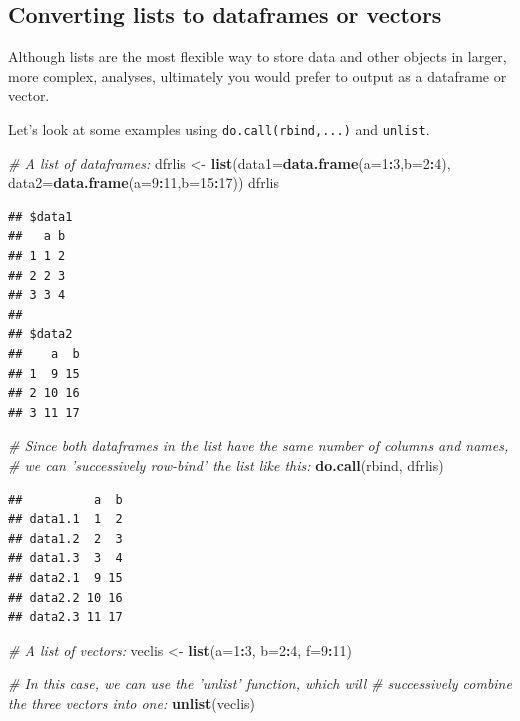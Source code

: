 \documentclass[]{book}
\newenvironment{Shaded}{\begin{snugshade}}{\end{snugshade}}
\newcommand{\CommentTok}[1]{\textcolor[rgb]{0.56,0.35,0.01}{\textit{#1}}}
\newcommand{\DataTypeTok}[1]{\textcolor[rgb]{0.13,0.29,0.53}{#1}}
\newcommand{\DecValTok}[1]{\textcolor[rgb]{0.00,0.00,0.81}{#1}}
\newcommand{\KeywordTok}[1]{\textcolor[rgb]{0.13,0.29,0.53}{\textbf{#1}}}
\newcommand{\NormalTok}[1]{#1}
\newcommand{\OperatorTok}[1]{\textcolor[rgb]{0.81,0.36,0.00}{\textbf{#1}}}
\newcommand{\StringTok}[1]{\textcolor[rgb]{0.31,0.60,0.02}{#1}}
\begin{document}
\hypertarget{converting-lists-to-dataframes-or-vectors}{%
\subsection{Converting lists to dataframes or vectors}\label{converting-lists-to-dataframes-or-vectors}}

Although lists are the most flexible way to store data and other objects in larger, more complex, analyses, ultimately you would prefer to output as a dataframe or vector.

Let's look at some examples using \texttt{do.call(rbind,...)} and \texttt{unlist}.

\begin{Shaded}
\begin{Highlighting}[]
\CommentTok{# A list of dataframes:}
\NormalTok{dfrlis <-}\StringTok{ }\KeywordTok{list}\NormalTok{(}\DataTypeTok{data1=}\KeywordTok{data.frame}\NormalTok{(}\DataTypeTok{a=}\DecValTok{1}\OperatorTok{:}\DecValTok{3}\NormalTok{,}\DataTypeTok{b=}\DecValTok{2}\OperatorTok{:}\DecValTok{4}\NormalTok{), }\DataTypeTok{data2=}\KeywordTok{data.frame}\NormalTok{(}\DataTypeTok{a=}\DecValTok{9}\OperatorTok{:}\DecValTok{11}\NormalTok{,}\DataTypeTok{b=}\DecValTok{15}\OperatorTok{:}\DecValTok{17}\NormalTok{))}
\NormalTok{dfrlis}
\end{Highlighting}
\end{Shaded}

\begin{verbatim}
## $data1
##   a b
## 1 1 2
## 2 2 3
## 3 3 4
## 
## $data2
##    a  b
## 1  9 15
## 2 10 16
## 3 11 17
\end{verbatim}

\begin{Shaded}
\begin{Highlighting}[]
\CommentTok{# Since both dataframes in the list have the same number of columns and names, }
\CommentTok{# we can 'successively row-bind' the list like this:}
\KeywordTok{do.call}\NormalTok{(rbind, dfrlis)}
\end{Highlighting}
\end{Shaded}

\begin{verbatim}
##          a  b
## data1.1  1  2
## data1.2  2  3
## data1.3  3  4
## data2.1  9 15
## data2.2 10 16
## data2.3 11 17
\end{verbatim}

\begin{Shaded}
\begin{Highlighting}[]
\CommentTok{# A list of vectors:}
\NormalTok{veclis <-}\StringTok{ }\KeywordTok{list}\NormalTok{(}\DataTypeTok{a=}\DecValTok{1}\OperatorTok{:}\DecValTok{3}\NormalTok{, }\DataTypeTok{b=}\DecValTok{2}\OperatorTok{:}\DecValTok{4}\NormalTok{, }\DataTypeTok{f=}\DecValTok{9}\OperatorTok{:}\DecValTok{11}\NormalTok{)}

\CommentTok{# In this case, we can use the 'unlist' function, which will }
\CommentTok{# successively combine the three vectors into one:}
\KeywordTok{unlist}\NormalTok{(veclis)}
\end{Highlighting}
\end{Shaded}
\end{document}
